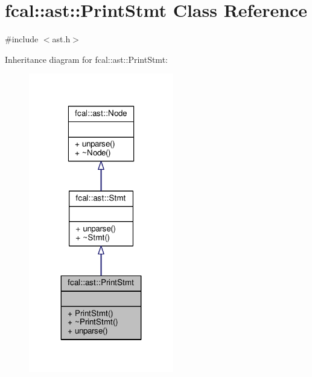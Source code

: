 \hypertarget{classfcal_1_1ast_1_1PrintStmt}{}\section{fcal\+:\+:ast\+:\+:Print\+Stmt Class Reference}
\label{classfcal_1_1ast_1_1PrintStmt}


{\ttfamily \#include $<$ast.\+h$>$}



Inheritance diagram for fcal\+:\+:ast\+:\+:Print\+Stmt\+:
\nopagebreak
\begin{figure}[H]
\begin{center}
\leavevmode
\includegraphics[width=179pt]{classfcal_1_1ast_1_1PrintStmt__inherit__graph}
\end{center}
\end{figure}


